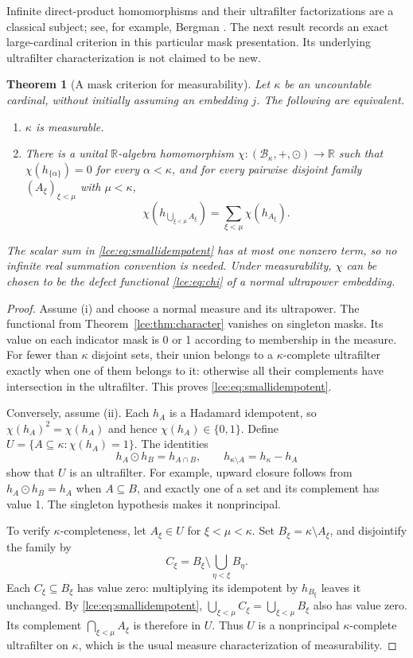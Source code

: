 \documentclass[11pt,letterpaper]{article}
\numberwithin{equation}{section}
\newtheorem{theorem}{Theorem}[section]
\theoremstyle{definition}
\theoremstyle{remark}
\newcommand{\R}{\mathbb R}
\newcommand{\thref}[1]{Theorem~\ref{#1}}
\begin{document}
Infinite direct-product homomorphisms and their ultrafilter factorizations
are a classical subject; see, for example, Bergman \cite{Bergman}.
The next result records an exact large-cardinal criterion in this particular
mask presentation. Its underlying ultrafilter characterization is not claimed
to be new.

\begin{theorem}[A mask criterion for measurability]\label{lce:thm:measurablecriterion}
Let $\kappa$ be an uncountable cardinal, without initially assuming an
embedding $j$. The following are equivalent.
\begin{enumerate}[label=\textup{(\roman*)}]
\item $\kappa$ is measurable.
\item There is a unital $\R$-algebra homomorphism
$\chi:(\mathcal B_\kappa,+,\odot)\to\R$ such that
$\chi(h_{\{\alpha\}})=0$ for every $\alpha<\kappa$, and for every
pairwise disjoint family $(A_\xi)_{\xi<\mu}$ with $\mu<\kappa$,
\begin{equation}\label{lce:eq:smallidempotent}
 \chi\left(h_{\bigcup_{\xi<\mu}A_\xi}\right)
    =\sum_{\xi<\mu}\chi(h_{A_\xi}).
\end{equation}
\end{enumerate}
The scalar sum in \eqref{lce:eq:smallidempotent} has at most one nonzero term,
so no infinite real summation convention is needed. Under measurability,
$\chi$ can be chosen to be the defect functional \eqref{lce:eq:chi} of a
normal ultrapower embedding.
\end{theorem}
\begin{proof}
Assume (i) and choose a normal measure and its ultrapower. The functional
from \thref{lce:thm:character} vanishes on singleton masks. Its value on each
indicator mask is 0 or 1 according to membership in the measure.
For fewer than $\kappa$ disjoint sets, their union belongs to a
$\kappa$-complete ultrafilter exactly when one of them belongs to it:
otherwise all their complements have intersection in the ultrafilter.
This proves \eqref{lce:eq:smallidempotent}.

Conversely, assume (ii). Each $h_A$ is a Hadamard idempotent, so
$\chi(h_A)^2=\chi(h_A)$ and hence $\chi(h_A)\in\{0,1\}$.
Define $U=\{A\subseteq\kappa:\chi(h_A)=1\}$. The identities
\[
 h_A\odot h_B=h_{A\cap B},\qquad
 h_{\kappa\setminus A}=h_\kappa-h_A
\]
show that $U$ is an ultrafilter. For example, upward closure follows from
$h_A\odot h_B=h_A$ when $A\subseteq B$, and exactly one of a set and
its complement has value 1. The singleton hypothesis makes it
nonprincipal.

To verify $\kappa$-completeness, let $A_\xi\in U$ for $\xi<\mu<\kappa$.
Set $B_\xi=\kappa\setminus A_\xi$, and disjointify the family by
\[
 C_\xi=B_\xi\setminus\bigcup_{\eta<\xi}B_\eta.
\]
Each $C_\xi\subseteq B_\xi$ has value zero: multiplying its idempotent
by $h_{B_\xi}$ leaves it unchanged. By \eqref{lce:eq:smallidempotent},
$\bigcup_{\xi<\mu}C_\xi=\bigcup_{\xi<\mu}B_\xi$ also has value zero.
Its complement $\bigcap_{\xi<\mu}A_\xi$ is therefore in $U$.
Thus $U$ is a nonprincipal $\kappa$-complete ultrafilter on $\kappa$,
which is the usual measure characterization of measurability.
\end{proof}
\end{document}
